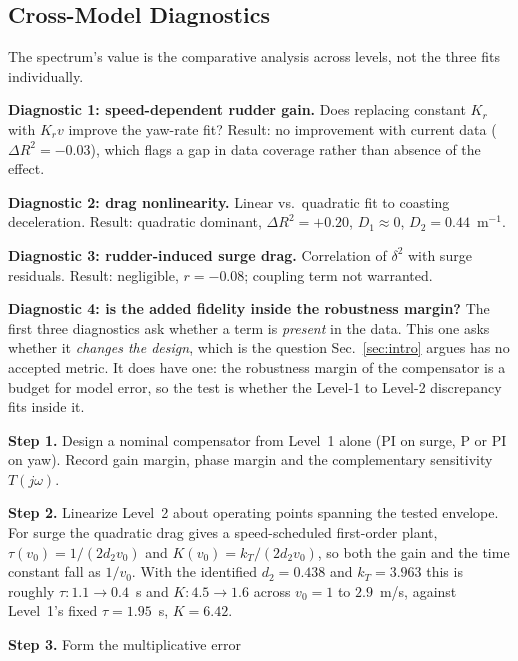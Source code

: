 \documentclass[11pt]{article}
\begin{document}
\subsection{Cross-Model Diagnostics}
\label{sec:diagnostics}
\begin{outline}
\item The spectrum's value is the comparative analysis across levels, not the three
  fits individually.
\item \textbf{Diagnostic 1: speed-dependent rudder gain.} Does replacing constant
  $K_r$ with $K_r v$ improve the yaw-rate fit? Result: no improvement with current
  data ($\Delta R^2 = -0.03$), which flags a gap in data coverage rather than
  absence of the effect.
\item \textbf{Diagnostic 2: drag nonlinearity.} Linear vs.\ quadratic fit to
  coasting deceleration. Result: quadratic dominant, $\Delta R^2 = +0.20$,
  $D_1 \approx 0$, $D_2 = 0.44$~m$^{-1}$.
\item \textbf{Diagnostic 3: rudder-induced surge drag.} Correlation of $\delta^2$
  with surge residuals. Result: negligible, $r = -0.08$; coupling term not
  warranted.
\item \textbf{Diagnostic 4: is the added fidelity inside the robustness margin?}
  The first three diagnostics ask whether a term is \emph{present} in the data. This
  one asks whether it \emph{changes the design}, which is the question
  Sec.~\ref{sec:intro} argues has no accepted metric. It does have one: the
  robustness margin of the compensator is a budget for model error, so the test is
  whether the Level-1 to Level-2 discrepancy fits inside it.
  \begin{outline}
  \item \textbf{Step 1.} Design a nominal compensator from Level~1 alone (PI on
    surge, P or PI on yaw). Record gain margin, phase margin and the complementary
    sensitivity $T(j\omega)$.
  \item \textbf{Step 2.} Linearize Level~2 about operating points spanning the tested
    envelope. For surge the quadratic drag gives a speed-scheduled first-order plant,
    $\tau(v_0) = 1/(2 d_2 v_0)$ and $K(v_0) = k_T/(2 d_2 v_0)$, so both the gain and
    the time constant fall as $1/v_0$. With the identified $d_2 = 0.438$ and
    $k_T = 3.963$ this is roughly $\tau: 1.1 \rightarrow 0.4$~s and
    $K: 4.5 \rightarrow 1.6$ across $v_0 = 1$ to $2.9$~m/s, against Level~1's fixed
    $\tau = 1.95$~s, $K = 6.42$.
  \item \textbf{Step 3.} Form the multiplicative error

\end{outline}
\end{outline}
\end{document}
